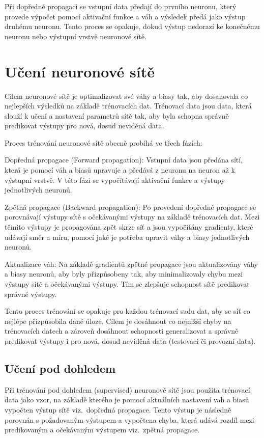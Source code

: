 Při dopředné propagaci se vstupní data předají do prvního neuronu, který provede výpočet pomocí aktivační funkce a váh a výsledek předá jako výstup druhému neuronu.
Tento proces se opakuje, dokud výstup nedorazí ke konečnému neuronu nebo výstupní vrstvě neuronové sítě.

\section{Učení neuronové sítě}
Cílem neuronové sítě je optimalizovat své váhy a biasy tak, aby dosahovala co nejlepších výsledků na základě trénovacích dat.
Trénovací data jsou data, která slouží k učení a nastavení parametrů sítě tak, aby byla schopna správně predikovat výstupy pro nová, dosud neviděná data.

Proces trénování neuronové sítě obecně probíhá ve třech fázích:

Dopředná propagace (Forward propagation): Vstupní data jsou předána sítí, která je pomocí váh a biasů upravuje a předává z neuronu na neuron až k výstupní vrstvě.
V této fázi se vypočítávají aktivační funkce a výstupy jednotlivých neuronů.

Zpětná propagace (Backward propagation): Po provedení dopředné propagace se porovnávají výstupy sítě s očekávanými výstupy na základě trénovacích dat.
Mezi těmito výstupy je propagována zpět skrze síť a jsou vypočítány gradienty, které udávají směr a míru, pomocí jaké je potřeba upravit váhy a biasy jednotlivých neuronů.
    
Aktualizace váh: Na základě gradientů zpětné propagace jsou aktualizovány váhy a biasy neuronů, aby byly přizpůsobeny tak, aby minimalizovaly chybu mezi výstupy sítě a očekávanými výstupy.
Tím se zlepšuje schopnost sítě predikovat správné výstupy.

Tento proces trénování se opakuje pro každou trénovací sadu dat, aby se síť co nejlépe přizpůsobila dané úloze.
Cílem je dosáhnout co nejnižší chyby na trénovacích datech a zároveň dosáhnout schopnosti generalizovat a správně predikovat výstupy i pro nová, dosud neviděná data (testovací či provozní data).

\subsection{Učení pod dohledem}
Při trénování pod dohledem (supervised) neuronové sítě jsou použita trénovací data jako vzor, na základě kterého je pomocí aktuálních nastavení vah a biasů vypočten výstup sítě viz.~dopředná propagace.
Tento výstup je následně porovnán s požadovaným výstupem a vypočtena chyba, která udává rozdíl mezi predikovaným a očekávaným výstupem viz.~zpětná propagace.

